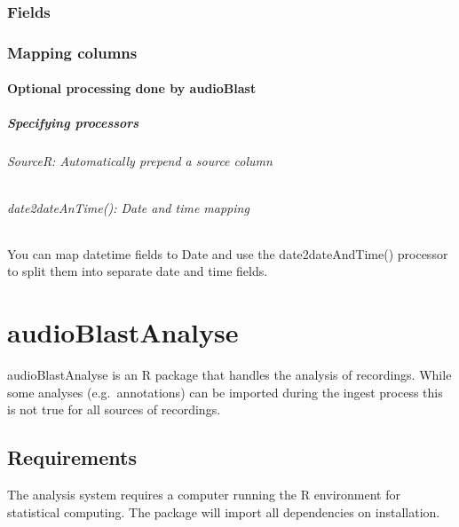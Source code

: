\documentclass[
]{book}
\begin{document}
\hypertarget{fields}{%
\subsection{Fields}\label{fields}}

\hypertarget{mapping-columns}{%
\subsection{Mapping columns}\label{mapping-columns}}

\hypertarget{optional-processing-done-by-audioblast}{%
\subsubsection{Optional processing done by audioBlast}\label{optional-processing-done-by-audioblast}}

\hypertarget{specifying-processors}{%
\paragraph{Specifying processors}\label{specifying-processors}}

\hypertarget{sourcer-automatically-prepend-a-source-column}{%
\subparagraph{SourceR: Automatically prepend a source column}\label{sourcer-automatically-prepend-a-source-column}}

\hypertarget{date2dateantime-date-and-time-mapping}{%
\subparagraph{date2dateAnTime(): Date and time mapping}\label{date2dateantime-date-and-time-mapping}}

You can map datetime fields to Date and use the date2dateAndTime() processor to split them into separate date and time fields.

\hypertarget{audioblastanalyse}{%
\chapter{audioBlastAnalyse}\label{audioblastanalyse}}

audioBlastAnalyse is an R package that handles the analysis of recordings. While some analyses (e.g.~annotations) can be imported during the ingest process this is not true for all sources of recordings.

\hypertarget{requirements}{%
\section{Requirements}\label{requirements}}

The analysis system requires a computer running the R environment for statistical computing. The package will import all dependencies on installation.
\end{document}
